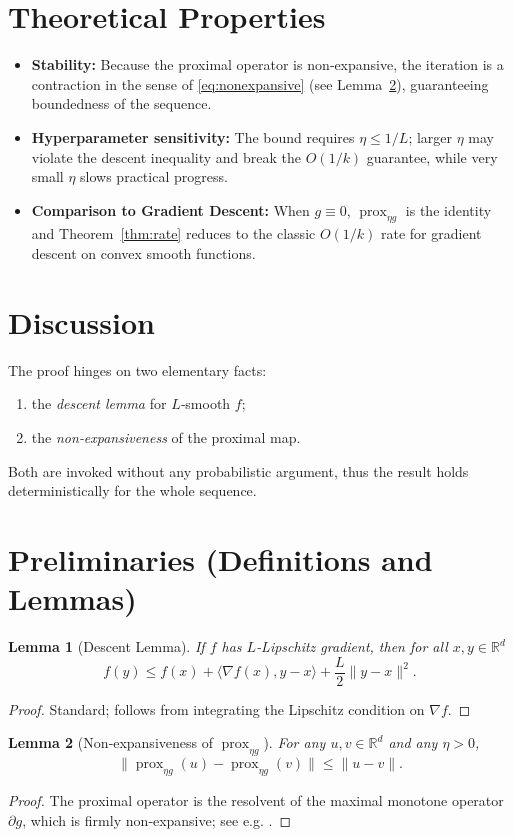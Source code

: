 \documentclass{article}
\newtheorem{lemma}{Lemma}
\newcommand{\prox}{\operatorname{prox}}
\newcommand{\R}{\mathbb{R}}
\begin{document}
\section*{Theoretical Properties}
\begin{itemize}[nosep]
  \item \textbf{Stability:} Because the proximal operator is non‑expansive, the iteration is a contraction in the sense of \eqref{eq:nonexpansive} (see Lemma~\ref{lem:nonexpansive}), guaranteeing boundedness of the sequence.
  \item \textbf{Hyperparameter sensitivity:} The bound requires $\eta\le 1/L$; larger $\eta$ may violate the descent inequality and break the $O(1/k)$ guarantee, while very small $\eta$ slows practical progress.
  \item \textbf{Comparison to Gradient Descent:} When $g\equiv0$, $\prox_{\eta g}$ is the identity and Theorem~\ref{thm:rate} reduces to the classic $O(1/k)$ rate for gradient descent on convex smooth functions.
\end{itemize}

\section*{Discussion}
The proof hinges on two elementary facts:
\begin{enumerate}[label=(\roman*)]
  \item the \emph{descent lemma} for $L$‑smooth $f$;
  \item the \emph{non‑expansiveness} of the proximal map.
\end{enumerate}
Both are invoked without any probabilistic argument, thus the result holds deterministically for the whole sequence.

\newpage

\section*{Preliminaries (Definitions and Lemmas)}
\begin{lemma}[Descent Lemma]\label{lem:descent}
If $f$ has $L$‑Lipschitz gradient, then for all $x,y\in\R^{d}$
\[
f(y)\le f(x)+\langle\nabla f(x),y-x\rangle+\frac{L}{2}\|y-x\|^{2}.
\]
\end{lemma}
\begin{proof}
Standard; follows from integrating the Lipschitz condition on $\nabla f$.
\end{proof}

\begin{lemma}[Non‑expansiveness of $\prox_{\eta g}$]\label{lem:nonexpansive}
For any $u,v\in\R^{d}$ and any $\eta>0$,
\[
\big\|\prox_{\eta g}(u)-\prox_{\eta g}(v)\big\|\le\|u-v\|.
\]
\end{lemma}
\begin{proof}
The proximal operator is the resolvent of the maximal monotone operator $\partial g$, which is firmly non‑expansive; see e.g. \cite{rockafellar1976}.
\end{proof}
\end{document}

